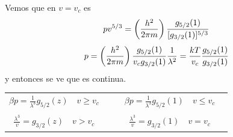 \documentclass[10pt,oneside]{CBFT_book}
\begin{document}
Vemos que en $ v = v_c $ es
\[
	pv^{5/3} = \left( \frac{ h^2 }{  2\pi m  } \right) \frac{ g_{5/2}(1) }{ [ g_{3/2}(1) ]^{5/3} }
\]
\[
	p = \left( \frac{ h^2 }{  2\pi m  } \right) \frac{ g_{5/2}(1) }{ v_c g_{3/2}(1) }\frac{1}{\lambda^2} =
	\frac{kT}{v_c}\frac{ g_{5/2}(1) }{ g_{3/2}(1) }
\]
y entonces se ve que es continua.

\begin{center}
\begin{tabular}{c|c}
 $\displaystyle \beta p = \frac{1}{\lambda^3} g_{5/2}(z) \quad v \geq v_c \quad $ & 
 $\displaystyle \quad \beta p = \frac{1}{\lambda^3} g_{5/2}(1) \quad v \leq v_c \quad $\\
 & \\
 $\displaystyle \frac{\lambda^3}{v} = g_{3/2}(z) \quad v > v_c \quad $ 
 & $\displaystyle \quad \frac{\lambda^3}{v} = g_{3/2}(1) \quad v = v_c \quad $
\end{tabular}
\end{center}
\end{document}
